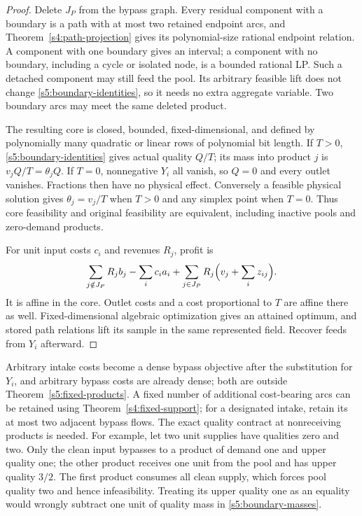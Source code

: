 \begin{proof}
Delete $J_P$ from the bypass graph. Every residual component with a
boundary is a path with at most two retained endpoint arcs, and
Theorem~\ref{s4:path-projection} gives its polynomial-size rational
endpoint relation. A component with one boundary gives an interval;
a component with no boundary, including a cycle or isolated node, is
a bounded rational LP. Such a detached component may still feed the
pool. Its arbitrary feasible lift does not change
\eqref{s5:boundary-identities}, so it needs no extra aggregate variable.
Two boundary arcs may meet the same deleted product.

The resulting core is closed, bounded, fixed-dimensional, and defined
by polynomially many quadratic or linear rows of polynomial bit length.
If $T>0$, \eqref{s5:boundary-identities} gives actual quality $Q/T$;
its mass into product $j$ is $v_jQ/T=\theta_jQ$. If $T=0$, nonnegative
$Y_i$ all vanish, so $Q=0$ and every outlet vanishes. Fractions then
have no physical effect. Conversely a feasible physical solution gives
$\theta_j=v_j/T$ when $T>0$ and any simplex point when $T=0$.
Thus core feasibility and original feasibility are equivalent, including
inactive pools and zero-demand products.

For unit input costs $c_i$ and revenues $R_j$, profit is
\[
 \sum_{j\notin J_P}R_jb_j-\sum_ic_i a_i
       +\sum_{j\in J_P}R_j\Bigl(v_j+\sum_i z_{ij}\Bigr).
\]
It is affine in the core. Outlet costs and a cost proportional to $T$
are affine there as well. Fixed-dimensional algebraic optimization gives
an attained optimum, and stored path relations lift its sample in the
same represented field. Recover feeds from $Y_i$ afterward.
\end{proof}

Arbitrary intake costs become a dense bypass objective after the
substitution for $Y_i$, and arbitrary bypass costs are already dense;
both are outside Theorem~\ref{s5:fixed-products}. A fixed number of additional
cost-bearing arcs can be retained using Theorem~\ref{s4:fixed-support};
for a designated intake, retain its at most two adjacent bypass flows.
The exact quality contract at nonreceiving products is needed. For
example, let two unit supplies have qualities zero and two. Only the
clean input bypasses to a product of demand one and upper quality one;
the other product receives one unit from the pool and has upper quality
$3/2$. The first product consumes all clean supply, which forces pool
quality two and hence infeasibility. Treating its upper quality one as
an equality would wrongly subtract one unit of quality mass in
\eqref{s5:boundary-masses}.

